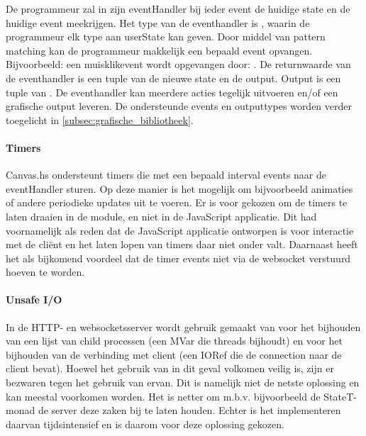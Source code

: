 De programmeur zal in zijn eventHandler bij ieder event de huidige state en de huidige event meekrijgen. Het type van de eventhandler is , waarin de programmeur elk type aan userState kan geven. Door middel van pattern matching kan de programmeur makkelijk een bepaald event opvangen. Bijvoorbeeld: een muisklikevent wordt opgevangen door: . De returnwaarde van de eventhandler is een tuple van de nieuwe state en de output. Output is een tuple van . De eventhandler kan meerdere acties tegelijk uitvoeren en/of een grafische output leveren. De ondersteunde events en outputtypes worden verder toegelicht in \autoref{subsec:grafische_bibliotheek}.

\paragraph{Timers}
Canvas.hs ondersteunt timers die met een bepaald interval events naar de eventHandler sturen. Op deze manier is het mogelijk om bijvoorbeeld animaties of andere periodieke updates uit te voeren. Er is voor gekozen om de timers te laten draaien in de module, en niet in de JavaScript applicatie. Dit had voornamelijk als reden dat de JavaScript applicatie ontworpen is voor interactie met de cliënt en het laten lopen van timers daar niet onder valt. Daarnaast heeft het als bijkomend voordeel dat de timer events niet via de websocket verstuurd hoeven te worden.

\paragraph{Unsafe I/O}
In de HTTP- en websocketsserver wordt gebruik gemaakt van  voor het bijhouden van een lijst van child processen (een MVar die threads bijhoudt) en voor het bijhouden van de verbinding met client (een IORef die de connection naar de client bevat). Hoewel het gebruik van  in dit geval volkomen veilig is, zijn er bezwaren tegen het gebruik van ervan\cite{Haskell.org2008}. Dit is namelijk niet de netste oplossing en kan meestal voorkomen worden. Het is netter om m.b.v. bijvoorbeeld de StateT-monad de server deze zaken bij te laten houden. Echter is het implementeren daarvan tijdsintensief en is daarom voor deze oplossing gekozen.